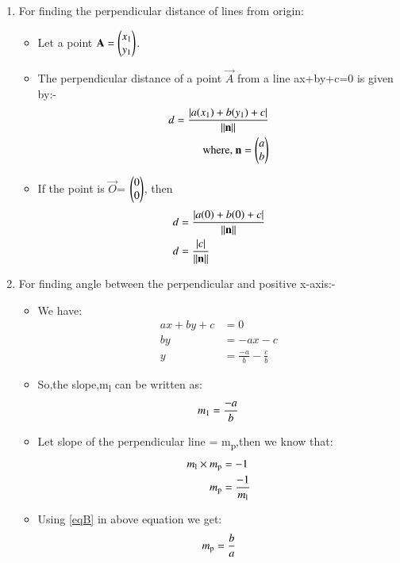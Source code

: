 \documentclass[journal,12pt,twocolumn]{IEEEtran}
\begin{document}
\begin{enumerate}
\item For finding the perpendicular distance of lines from origin:
\begin{itemize}
\item Let a point $\mathbf{A}=\begin{pmatrix}x\textsubscript{1}\\y\textsubscript{1}\end{pmatrix}$.
\item The perpendicular distance of a point $\vec{A}$ from a line ax+by+c=0 is given by:-
\begin{align}
d=\frac { \left| a(x\textsubscript{1})+b(y\textsubscript{1})+c \right| }{ \lVert\mathbf{n}\rVert }
\\
\text{where, } \mathbf{n}=\begin{pmatrix}a\\b\end{pmatrix}
\end{align}
\item If the point is $\vec{O}$= $\begin{pmatrix}0\\0\end{pmatrix}$, then
\begin{align}
d &=\frac { \left| a(0)+b(0)+c \right| }{ \lVert\mathbf{n}\rVert}
\\
d&=\frac { \left| c \right| }{\lVert\mathbf{n}\rVert}\label{eqA}
\end{align}
\end{itemize}
\item For finding angle between the perpendicular and positive x-axis:-
\begin{itemize}
    \item We have: 
    \begin{align}
    ax+by+c&=0
    \\
    by&=-ax-c
    \\
    y&=\frac{-a}{b}-\frac{c}{b}
    \end{align}
\item So,the slope,m\textsubscript{l} can be written as:
\begin{align}
 m\textsubscript{1}=\frac{-a}{b} \label{eqB}
 \end{align}
\item Let slope of the perpendicular line = m\textsubscript{p},then we know that:
\begin{align}
     m\textsubscript{l}\times m\textsubscript{p}&=-1
     \\
     m\textsubscript{p}&=\frac{-1}{m\textsubscript{l}}
\end{align}
\item Using \eqref{eqB} in above equation we get:
\begin{align}
     m\textsubscript{p}&=\frac{b}{a} \label{eqC}
     \\

\end{align}
\end{itemize}
\end{enumerate}
\end{document}
